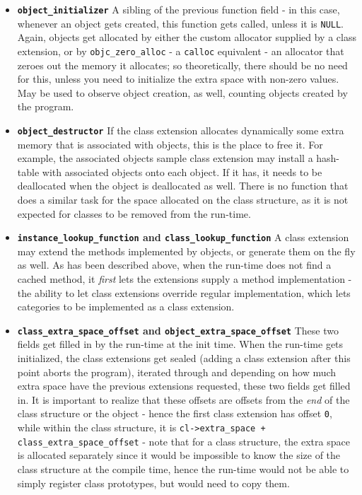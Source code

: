 \begin{itemize}
  \item{\bf{\tt{object\_initializer}}} A sibling of the previous function field - in this case, whenever an object gets created, this function gets called, unless it is \texttt{NULL}. Again, objects get allocated by either the custom allocator supplied by a class extension, or by \verb=objc_zero_alloc= - a \verb=calloc= equivalent - an allocator that zeroes out the memory it allocates; so theoretically, there should be no need for this, unless you need to initialize the extra space with non-zero values. May be used to observe object creation, as well, counting objects created by the program.
  \item{\bf{\tt{object\_destructor}}} If the class extension allocates dynamically some extra memory that is associated with objects, this is the place to free it. For example, the associated objects sample class extension may install a hash-table with associated objects onto each object. If it has, it needs to be deallocated when the object is deallocated as well.
  There is no function that does a similar task for the space allocated on the class structure, as it is not expected for classes to be removed from the run-time.
  \item{\bf{\tt{instance\_lookup\_function}} and \bf{\tt{class\_lookup\_function}}} A class extension may extend the methods implemented by objects, or generate them on the fly as well. As has been described above, when the run-time does not find a cached method, it \emph{first} lets the extensions supply a method implementation - the ability to let class extensions override regular implementation, which lets categories to be implemented as a class extension.
  \item{\bf{\tt{class\_extra\_space\_offset}} and \bf{\tt{object\_extra\_space\_offset}}} These two fields get filled in by the run-time at the init time. When the run-time gets initialized, the class extensions get sealed (adding a class extension after this point aborts the program), iterated through and depending on how much extra space have the previous extensions requested, these two fields get filled in. It is important to realize that these offsets are offsets from the \emph{end} of the class structure or the object - hence the first class extension has offset \texttt{0}, while within the class structure, it is \texttt{cl->extra\_space + class\_extra\_space\_offset} - note that for a class structure, the extra space is allocated separately since it would be impossible to know the size of the class structure at the compile time, hence the run-time would not be able to simply register class prototypes, but would need to copy them. 
 
\end{itemize}

